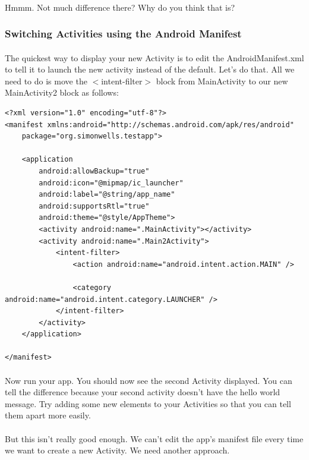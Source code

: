 \paragraph{} Hmmm. Not much difference there? Why do you think that is?

\subsubsection{Switching Activities using the Android Manifest}

\paragraph{} The quickest way to display your new Activity is to edit the AndroidManifest.xml to tell it to launch the new activity instead of the default. Let's do that. All we need to do is move the $<$intent-filter$>$ block from MainActivity to our new MainActivity2 block as follows:
\begin{lstlisting}
<?xml version="1.0" encoding="utf-8"?>
<manifest xmlns:android="http://schemas.android.com/apk/res/android"
    package="org.simonwells.testapp">

    <application
        android:allowBackup="true"
        android:icon="@mipmap/ic_launcher"
        android:label="@string/app_name"
        android:supportsRtl="true"
        android:theme="@style/AppTheme">
        <activity android:name=".MainActivity"></activity>
        <activity android:name=".Main2Activity">
            <intent-filter>
                <action android:name="android.intent.action.MAIN" />

                <category android:name="android.intent.category.LAUNCHER" />
            </intent-filter>
        </activity>
    </application>

</manifest>
\end{lstlisting}


\paragraph{} Now run your app. You should now see the second Activity displayed. You can tell the difference because your second activity doesn't have the hello world message. Try adding some new elements to your Activities so that you can tell them apart more easily.

\paragraph{} But this isn't really good enough. We can't edit the app's manifest file every time we want to create a new Activity. We need another approach.

